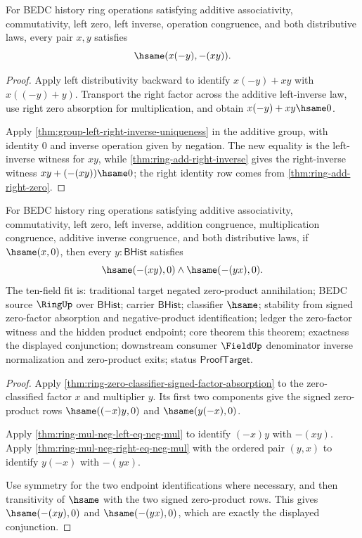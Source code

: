 \begin{theorem}
\label{thm:ring-mul-neg-right-eq-neg-mul}
For BEDC history ring operations satisfying additive associativity,
commutativity, left zero, left inverse, operation congruence, and both
distributive laws, every pair $x,y$ satisfies
$$
\hsame(x(-y),-(xy)).
$$
\end{theorem}
\begin{proof}
Apply left distributivity backward to identify $x(-y)+xy$ with
$x((-y)+y)$. Transport the right factor across the additive left-inverse law,
use right zero absorption for multiplication, and obtain
$x(-y)+xy\hsame0$.

Apply \autoref{thm:group-left-right-inverse-uniqueness} in the additive group,
with identity $0$ and inverse operation given by negation. The new equality is
the left-inverse witness for $xy$, while \autoref{thm:ring-add-right-inverse}
gives the right-inverse witness $xy+(-(xy))\hsame0$; the right identity row
comes from \autoref{thm:ring-add-right-zero}.
\end{proof}

\begin{theorem}
\label{thm:ring-zero-classifier-negated-product-annihilation}
For BEDC history ring operations satisfying additive associativity,
commutativity, left zero, left inverse, addition congruence, multiplication
congruence, additive inverse congruence, and both distributive laws, if
$\hsame(x,0)$, then every $y:\mathsf{BHist}$ satisfies
$$
\hsame(-(xy),0)\land \hsame(-(yx),0).
$$
The ten-field fit is: traditional target negated zero-product annihilation;
BEDC source $\RingUp$ over $\mathsf{BHist}$; carrier $\mathsf{BHist}$;
classifier $\hsame$; stability from signed zero-factor absorption and
negative-product identification; ledger the zero-factor witness and the hidden
product endpoint; core theorem this theorem; exactness the displayed
conjunction; downstream consumer $\FieldUp$ denominator inverse normalization
and zero-product exits; status $\mathsf{ProofTarget}$.
\end{theorem}
\begin{proof}
Apply \autoref{thm:ring-zero-classifier-signed-factor-absorption} to the
zero-classified factor $x$ and multiplier $y$. Its first two components give
the signed zero-product rows $\hsame((-x)y,0)$ and $\hsame(y(-x),0)$.

Apply \autoref{thm:ring-mul-neg-left-eq-neg-mul} to identify $(-x)y$ with
$-(xy)$. Apply \autoref{thm:ring-mul-neg-right-eq-neg-mul} with the ordered
pair $(y,x)$ to identify $y(-x)$ with $-(yx)$.

Use symmetry for the two endpoint identifications where necessary, and then
transitivity of $\hsame$ with the two signed zero-product rows. This gives
$\hsame(-(xy),0)$ and $\hsame(-(yx),0)$, which are exactly the displayed
conjunction.
\end{proof}

